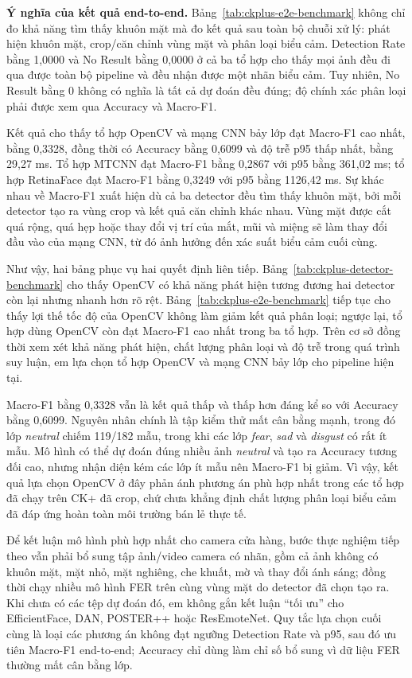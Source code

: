 \textbf{Ý nghĩa của kết quả end-to-end.} Bảng~\ref{tab:ckplus-e2e-benchmark} không chỉ đo khả năng tìm thấy khuôn mặt mà đo kết quả sau toàn bộ chuỗi xử lý: phát hiện khuôn mặt, crop/căn chỉnh vùng mặt và phân loại biểu cảm. Detection Rate bằng 1,0000 và No Result bằng 0,0000 ở cả ba tổ hợp cho thấy mọi ảnh đều đi qua được toàn bộ pipeline và đều nhận được một nhãn biểu cảm. Tuy nhiên, No Result bằng 0 không có nghĩa là tất cả dự đoán đều đúng; độ chính xác phân loại phải được xem qua Accuracy và Macro-F1.

Kết quả cho thấy tổ hợp OpenCV và mạng CNN bảy lớp đạt Macro-F1 cao nhất, bằng 0,3328, đồng thời có Accuracy bằng 0,6099 và độ trễ p95 thấp nhất, bằng 29,27 ms. Tổ hợp MTCNN đạt Macro-F1 bằng 0,2867 với p95 bằng 361,02 ms; tổ hợp RetinaFace đạt Macro-F1 bằng 0,3249 với p95 bằng 1126,42 ms. Sự khác nhau về Macro-F1 xuất hiện dù cả ba detector đều tìm thấy khuôn mặt, bởi mỗi detector tạo ra vùng crop và kết quả căn chỉnh khác nhau. Vùng mặt được cắt quá rộng, quá hẹp hoặc thay đổi vị trí của mắt, mũi và miệng sẽ làm thay đổi đầu vào của mạng CNN, từ đó ảnh hưởng đến xác suất biểu cảm cuối cùng.

Như vậy, hai bảng phục vụ hai quyết định liên tiếp. Bảng~\ref{tab:ckplus-detector-benchmark} cho thấy OpenCV có khả năng phát hiện tương đương hai detector còn lại nhưng nhanh hơn rõ rệt. Bảng~\ref{tab:ckplus-e2e-benchmark} tiếp tục cho thấy lợi thế tốc độ của OpenCV không làm giảm kết quả phân loại; ngược lại, tổ hợp dùng OpenCV còn đạt Macro-F1 cao nhất trong ba tổ hợp. Trên cơ sở đồng thời xem xét khả năng phát hiện, chất lượng phân loại và độ trễ trong quá trình suy luận, em lựa chọn tổ hợp OpenCV và mạng CNN bảy lớp cho pipeline hiện tại.

Macro-F1 bằng 0,3328 vẫn là kết quả thấp và thấp hơn đáng kể so với Accuracy bằng 0,6099. Nguyên nhân chính là tập kiểm thử mất cân bằng mạnh, trong đó lớp \textit{neutral} chiếm 119/182 mẫu, trong khi các lớp \textit{fear}, \textit{sad} và \textit{disgust} có rất ít mẫu. Mô hình có thể dự đoán đúng nhiều ảnh \textit{neutral} và tạo ra Accuracy tương đối cao, nhưng nhận diện kém các lớp ít mẫu nên Macro-F1 bị giảm. Vì vậy, kết quả lựa chọn OpenCV ở đây phản ánh phương án phù hợp nhất trong các tổ hợp đã chạy trên CK+ đã crop, chứ chưa khẳng định chất lượng phân loại biểu cảm đã đáp ứng hoàn toàn môi trường bán lẻ thực tế.

Để kết luận mô hình phù hợp nhất cho camera cửa hàng, bước thực nghiệm tiếp theo vẫn phải bổ sung tập ảnh/video camera có nhãn, gồm cả ảnh không có khuôn mặt, mặt nhỏ, mặt nghiêng, che khuất, mờ và thay đổi ánh sáng; đồng thời chạy nhiều mô hình FER trên cùng vùng mặt do detector đã chọn tạo ra. Khi chưa có các tệp dự đoán đó, em không gắn kết luận ``tối ưu'' cho EfficientFace, DAN, POSTER++ hoặc ResEmoteNet. Quy tắc lựa chọn cuối cùng là loại các phương án không đạt ngưỡng Detection Rate và p95, sau đó ưu tiên Macro-F1 end-to-end; Accuracy chỉ dùng làm chỉ số bổ sung vì dữ liệu FER thường mất cân bằng lớp.

